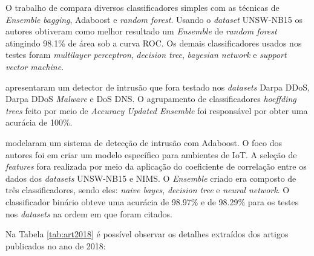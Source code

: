 O trabalho de  compara diversos classificadores simples com as técnicas de \textit{Ensemble} \textit{bagging}, Adaboost e \textit{random forest}. Usando o \textit{dataset} UNSW-NB15 os autores obtiveram como melhor resultado um \textit{Ensemble} de \textit{random forest} atingindo 98.1\% de área sob a curva ROC. Os demais classificadores usados nos testes foram \textit{multilayer perceptron}, \textit{decision tree}, \textit{bayesian network} e \textit{support vector machine}.

 apresentaram um detector de intrusão que fora testado nos \textit{datasets} Darpa DDoS, Darpa DDoS \textit{Malware} e DoS DNS. O agrupamento de classificadores \textit{hoeffding trees} feito por meio de \textit{Accuracy Updated Ensemble} foi responsável por obter uma acurácia de 100\%.

 modelaram um sistema de detecção de intrusão com Adaboost. O foco dos autores foi em criar um modelo específico para ambientes de IoT. A seleção de \textit{features} fora realizada por meio da aplicação do coeficiente de correlação entre os dados dos \textit{datasets} UNSW-NB15 e NIMS. O \textit{Ensemble} criado era composto de três classificadores, sendo eles: \textit{naive bayes}, \textit{decision tree} e \textit{neural network}. O classificador binário obteve uma acurácia de 98.97\% e de 98.29\% para os testes nos \textit{datasets} na ordem em que foram citados.


Na Tabela \ref{tab:art2018} é possível observar os detalhes extraídos dos artigos publicados no ano de 2018:





